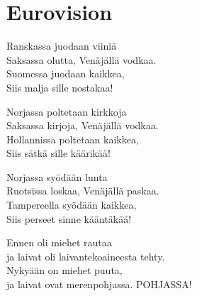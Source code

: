 \section{Eurovision}

Ranskassa juodaan viiniä\\
Saksassa olutta, Venäjällä vodkaa.\\
Suomessa juodaan kaikkea,\\
Siis malja sille nostakaa!

Norjassa poltetaan kirkkoja\\
Saksassa kirjoja, Venäjällä vodkaa.\\
Hollannissa poltetaan kaikkea,\\
Siis sätkä sille käärikää!

Norjassa syödään lunta\\
Ruotsissa loskaa, Venäjällä paskaa.\\
Tampereella syödään kaikkea,\\
Siis perseet sinne kääntäkää!

Ennen oli miehet rautaa\\
ja laivat oli laivantekoaineesta tehty.\\
Nykyään on miehet puuta,\\
ja laivat ovat merenpohjassa. POHJASSA!